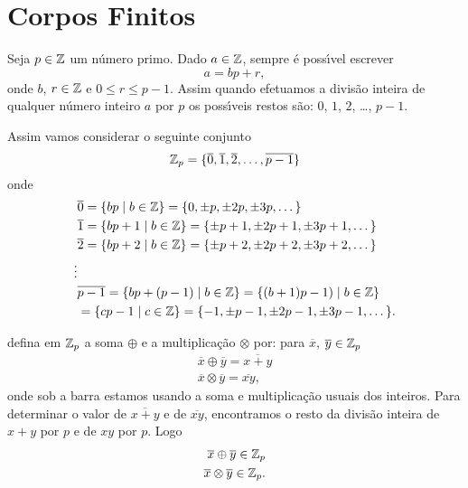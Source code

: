 
\section{Corpos Finitos}\label{sec:corpor_finitos}

Seja $p \in \mathbb{Z}$ um n\'umero primo. Dado $a \in \mathbb{Z}$, sempre \'e poss{\'\i}vel escrever
\[
a = bp + r,
\]
onde $b$, $r \in \mathbb{Z}$ e $0 \le r \le p - 1$. Assim quando efetuamos a divis\~ao inteira de qualquer n\'umero inteiro $a$ por $p$ os poss{\'\i}veis restos s\~ao: $0$, 
$1$, $2$, \dots, $p -1 $.

Assim vamos considerar o seguinte conjunto
\[
\mathbb{Z}_p = \{\overline{0}, \overline{1}, \overline{2}, \dots, \overline{p - 1}\}
\]
onde
\begin{align*}
&\overline{0} = \{bp \mid b \in \mathbb{Z}\} = \{0, \pm p, \pm 2p, \pm 3p, \dots\}\\
&\overline{1} = \{bp + 1\mid b \in \mathbb{Z}\} = \{\pm p + 1, \pm 2p + 1, \pm 3p + 1, \dots\}\\
&\overline{2} = \{bp + 2\mid b \in \mathbb{Z}\} = \{\pm p + 2, \pm 2p + 2, \pm 3p + 2, \dots\}\\
\vdots\\
&\overline{p - 1} = \{bp + (p - 1) \mid b \in \mathbb{Z}\} = \{(b + 1)p - 1) \mid b \in \mathbb{Z}\}\\ &= \{cp - 1 \mid c \in \mathbb{Z}\} = \{-1, \pm p - 1, \pm 2p - 1, \pm 3p - 1, \dots\}.
\end{align*}

defina em $\mathbb{Z}_p$ a soma $\oplus$ e a multiplica\c{c}\~ao $\otimes$ por: para $\overline{x}$, $\overline{y} \in \mathbb{Z}_p$
\begin{align*}
\overline{x} \oplus \overline{y} = \overline{x + y}\\
\overline{x} \otimes \overline{y} = \overline{xy},
\end{align*}
onde sob a barra estamos usando a soma e multiplica\c{c}\~ao usuais dos inteiros. Para determinar o valor de $\overline{x + y}$ e de $\overline{xy}$, encontramos o resto da divis\~ao inteira de $x + y$ por $p$ e de $xy$ por $p$. Logo
\begin{align*}
\overline{x} \oplus \overline{y} \in \mathbb{Z}_p\\
\overline{x} \otimes \overline{y} \in \mathbb{Z}_p.
\end{align*}

